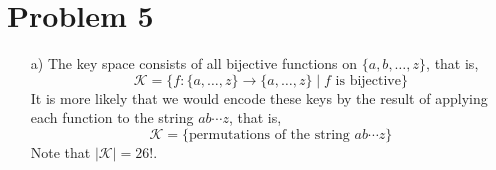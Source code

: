 \documentclass[12pt]{article}
\numberwithin{equation}{section}
\theoremstyle{plain}
\newcommand{\set}[1]{\{ #1 \}}
\newcommand{\keys}{\mathcal{K}}
\begin{document}
\section*{Problem 5}
\begin{enumerate}
    \item[a)] The key space consists of all bijective functions on $\set{ a, b, \ldots, z }$, that is,
    \begin{equation*}
        \keys = \set{ f:\set{a, \ldots, z} \to \set{a, \ldots, z} \mid f \text{ is bijective}}
    \end{equation*}
    It is more likely that we would encode these keys by the result of applying each function to the string $ab\cdots z$,
    that is,
    \begin{equation*}
        \keys = \set{ \text{permutations of the string } ab\cdots z }
    \end{equation*}
    Note that $|\keys| = 26!$.
    

\end{enumerate}
\end{document}
